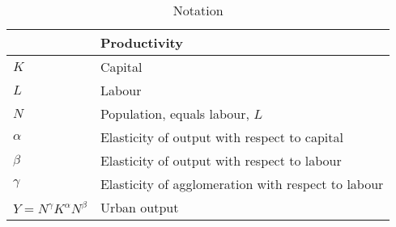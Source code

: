 \begin{longtable}{lp{10cm}}
\caption{Notation}                       \\

\hline           &  \textbf{Productivity} \\ \hline
$K$              &  Capital               \\ 
$L$              &  Labour                \\
$N$              &  Population, equals labour, $L$                        \\ 
$\alpha$         &  Elasticity of output with respect to capital          \\
$\beta$          &  Elasticity of output with respect to labour           \\ %
$\gamma$         &  Elasticity of agglomeration with respect to labour    \\ %
$Y=N^\gamma K^{\alpha }N^{\beta }$  &  Urban output                       \\


\end{longtable}

